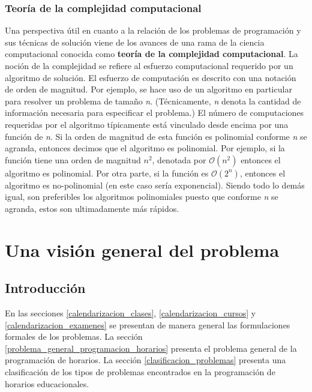 \documentclass[draft,12pt,headsepline,footsepline,paper=letter]{scrreprt}
\newcommand{\BigO}{\ensuremath{\mathcal{O}}}%
\begin{document}
\subsection{Teoría de la complejidad computacional} %
\label{teoria_complejidad_computacional}

Una perspectiva útil en cuanto a la relación de los problemas de programación y sus técnicas de solución viene de los avances de una rama de la ciencia computacional conocida como \textbf{teoría de la complejidad computacional}. La noción de la complejidad se refiere al esfuerzo computacional requerido por un algoritmo de solución. El esfuerzo de computación es descrito con una notación de orden de magnitud.
%
Por ejemplo, se hace uso de un algoritmo en particular para resolver un problema de tamaño \textit{n}. (Técnicamente, \textit{n} denota la cantidad de información necesaria para especificar el problema.) El número de computaciones requeridas por el algoritmo típicamente está vinculado desde encima por una función de \textit{n}. Si la orden de magnitud de esta función es polinomial conforme \textit{n} se agranda, entonces decimos que el algoritmo es polinomial.
%
Por ejemplo, si la función tiene una orden de magnitud $\textit{n}^2$, denotada por $\BigO(\textit{n}^2)$ entonces el algoritmo es polinomial. Por otra parte, si la función es $\BigO(2^\textit{n})$, entonces el algoritmo es no-polinomial (en este caso sería exponencial). Siendo todo lo demás igual, son preferibles los algoritmos polinomiales puesto que conforme \textit{n} se agranda, estos son ultimadamente más rápidos.

\chapter{Una visión general del problema}
\label{vision_general_problema}

\section{Introducción}
\label{introduccion_vision_general}

En las secciones \ref{calendarizacion_clases}, \ref{calendarizacion_cursos} y \ref{calendarizacion_examenes} se presentan de manera general las formulaciones formales de los problemas.
La sección \ref{problema_general_programacion_horarios} presenta el problema general de la programación de horarios. La sección \ref{clasificacion_problemas} presenta una clasificación de los tipos de problemas encontrados en la programación de horarios educacionales. 
\end{document}
